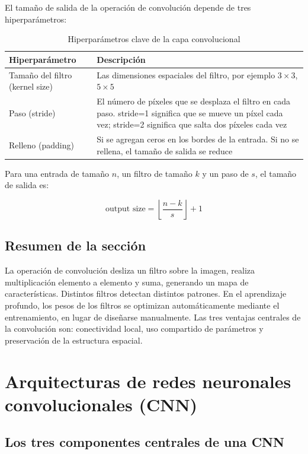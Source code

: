 \documentclass[a4paper]{article}
\begin{document}
El tamaño de salida de la operación de convolución depende de tres hiperparámetros:

\begin{table}[H]
\centering
\begin{tabular}{lp{10cm}}
\toprule
\textbf{Hiperparámetro} & \textbf{Descripción} \\
\midrule
Tamaño del filtro (kernel size) & Las dimensiones espaciales del filtro, por ejemplo $3 \times 3$, $5 \times 5$ \\
Paso (stride) & El número de píxeles que se desplaza el filtro en cada paso. stride=1 significa que se mueve un píxel cada vez; stride=2 significa que salta dos píxeles cada vez \\
Relleno (padding) & Si se agregan ceros en los bordes de la entrada. Si no se rellena, el tamaño de salida se reduce \\
\bottomrule
\end{tabular}
\caption{Hiperparámetros clave de la capa convolucional}
\end{table}

Para una entrada de tamaño $n$, un filtro de tamaño $k$ y un paso de $s$, el tamaño de salida es:

$$\text{output size} = \left\lfloor \frac{n - k}{s} \right\rfloor + 1$$

\subsection{Resumen de la sección}

La operación de convolución desliza un filtro sobre la imagen, realiza multiplicación elemento a elemento y suma, generando un mapa de características. Distintos filtros detectan distintos patrones. En el aprendizaje profundo, los pesos de los filtros se optimizan automáticamente mediante el entrenamiento, en lugar de diseñarse manualmente. Las tres ventajas centrales de la convolución son: conectividad local, uso compartido de parámetros y preservación de la estructura espacial.

\newpage
\section{Arquitecturas de redes neuronales convolucionales (CNN)}

\subsection{Los tres componentes centrales de una CNN}
\end{document}
